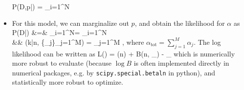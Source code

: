 \begin{itemize}
	\be
		P(D,p\;|\;\alpha) = \prod_{i=1}^N
	\ee
	\item For this model, we can marginalize out $p$, and obtain the likelihood for $\alpha$ as
	\ba
		P(D\;|\;\alpha) &=& \prod_{i=1}^N = \prod_{i=1}^N
		\\
		 && (k\;|\;n, \{\alpha_j\}_{j=1}^M) =  \prod_{j=1}^M ,
	\ea
	where $\alpha_\text{tot} = \sum_{j=1}^M \alpha_j$. The log likelihood can be written as
	\be
		L(\alpha) = \log(n) + \log B(n, \alpha_) - _
	\ee
	which is numerically more robust to evaluate (because $\log B$ is often implemented directly in numerical packages, e.g. by \texttt{scipy.special.betaln} in python), and statistically more robust to optimize.
\end{itemize}

\newpage
{}

